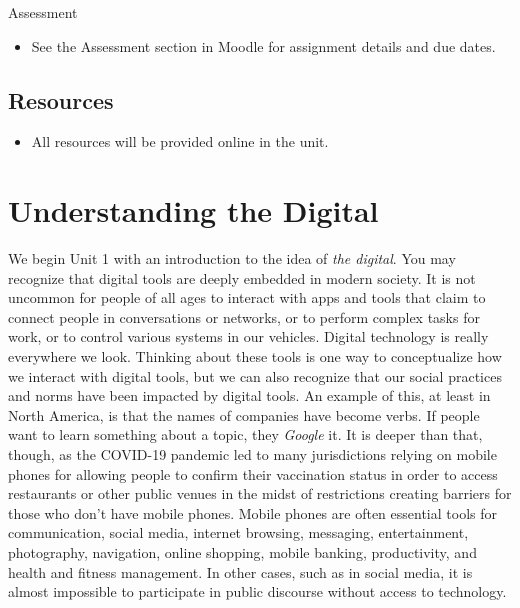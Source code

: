 \documentclass[
]{book}
\providecommand{\tightlist}{%
  \setlength{\itemsep}{0pt}\setlength{\parskip}{0pt}}
\theoremstyle{definition}
\theoremstyle{definition}
\theoremstyle{definition}
\theoremstyle{definition}
\theoremstyle{remark}
\begin{document}
\begin{assessment}
{Assessment}

\begin{itemize}
\tightlist
\item
  See the Assessment section in Moodle for assignment details and due dates.
\end{itemize}
\end{assessment}

\hypertarget{resources}{%
\subsection*{Resources}\label{resources}}

\begin{itemize}
\tightlist
\item
  All resources will be provided online in the unit.
\end{itemize}

\hypertarget{understanding-the-digital}{%
\section{Understanding the Digital}\label{understanding-the-digital}}

We begin Unit 1 with an introduction to the idea of \emph{the digital}. You may recognize that digital tools are deeply embedded in modern society. It is not uncommon for people of all ages to interact with apps and tools that claim to connect people in conversations or networks, or to perform complex tasks for work, or to control various systems in our vehicles. Digital technology is really everywhere we look. Thinking about these tools is one way to conceptualize how we interact with digital tools, but we can also recognize that our social practices and norms have been impacted by digital tools. An example of this, at least in North America, is that the names of companies have become verbs. If people want to learn something about a topic, they \emph{Google} it. It is deeper than that, though, as the COVID-19 pandemic led to many jurisdictions relying on mobile phones for allowing people to confirm their vaccination status in order to access restaurants or other public venues in the midst of restrictions creating barriers for those who don't have mobile phones. Mobile phones are often essential tools for communication, social media, internet browsing, messaging, entertainment, photography, navigation, online shopping, mobile banking, productivity, and health and fitness management. In other cases, such as in social media, it is almost impossible to participate in public discourse without access to technology.
\end{document}
